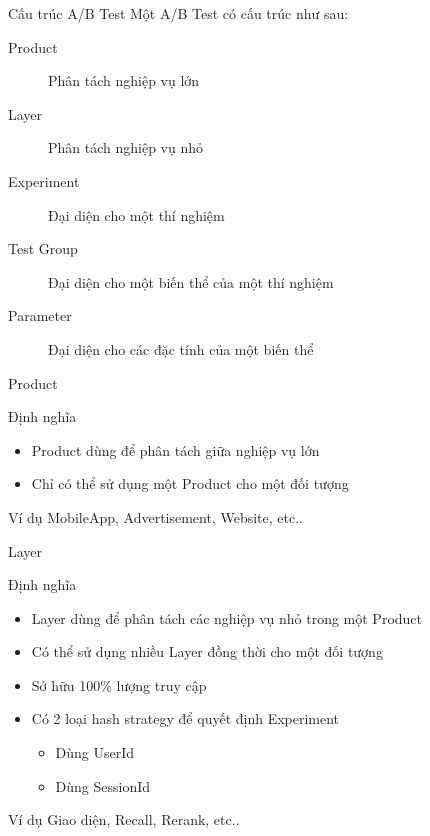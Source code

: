 \begin{frame}{Cấu trúc A/B Test}
	Một \alert{A/B Test} có cấu trúc như sau:
	\begin{description}
		\item[Product] Phân tách nghiệp vụ lớn
		\item[Layer] Phân tách nghiệp vụ nhỏ
		\item[Experiment] Đại diện cho một thí nghiệm
		\item[Test Group] Đại diện cho một biến thể của một thí nghiệm
		\item[Parameter] Đại diện cho các đặc tính của một biến thể
	\end{description}
\end{frame}

\begin{frame}{Product}
	\begin{block}{Định nghĩa}
		\begin{itemize}
			\item Product dùng để phân tách giữa nghiệp vụ lớn
			\item Chỉ có thể sử dụng một Product cho một đối tượng
		\end{itemize}
	\end{block}
	\begin{block}{Ví dụ}
		MobileApp, Advertisement, Website, etc..
	\end{block}
\end{frame}

\begin{frame}{Layer}
	\begin{block}{Định nghĩa}
		\begin{itemize}
			\item Layer dùng để phân tách các nghiệp vụ nhỏ trong một Product
			\item Có thể sử dụng nhiều Layer đồng thời cho một đối tượng
			\item Sở hữu 100\% lượng truy cập
			\item Có 2 loại hash strategy để quyết định Experiment
			      \begin{itemize}
				      \item Dùng UserId
				      \item Dùng SessionId
			      \end{itemize}
		\end{itemize}
	\end{block}
	\begin{block}{Ví dụ}
		Giao diện, Recall, Rerank, etc..
	\end{block}
\end{frame}

